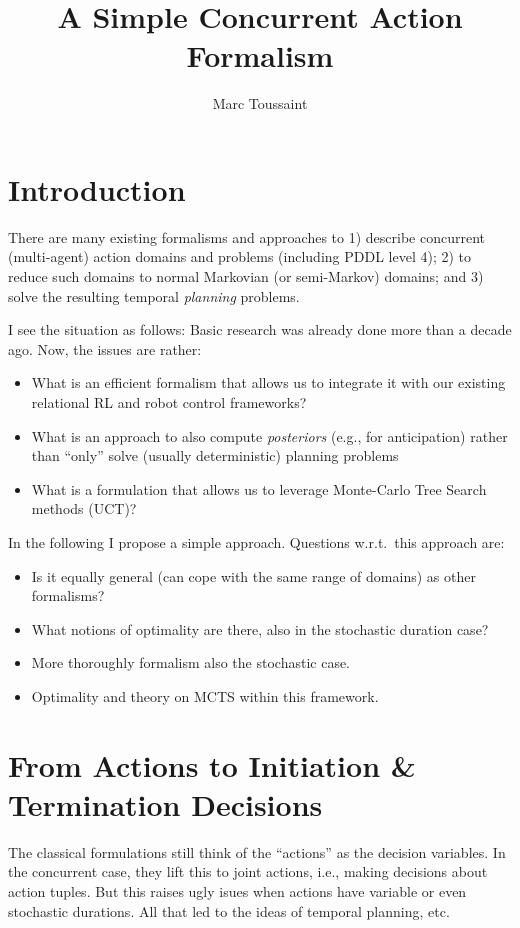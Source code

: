\documentclass[10pt,fleqn,twoside]{article}
\title{A Simple Concurrent Action Formalism}
\author{Marc Toussaint}
\begin{document}
\maketitle

\section{Introduction}

There are many existing formalisms and approaches to 1) describe
concurrent (multi-agent) action domains and problems (including PDDL
level 4); 2) to reduce such domains to normal Markovian (or
semi-Markov) domains; and 3) solve the resulting temporal \emph{planning}
problems. \cite{*}

I see the situation as follows: Basic research was already done more
than a decade ago. Now, the issues are rather:
\begin{itemize}
\item What is an efficient formalism that allows us
  to integrate it with our existing relational RL and robot control
  frameworks?
\item What is an approach to also compute \emph{posteriors} (e.g., for
  anticipation) rather than ``only'' solve (usually deterministic)
  planning problems
\item What is a formulation that allows us to leverage Monte-Carlo
  Tree Search methods (UCT)?
\end{itemize}

In the following I propose a simple approach. Questions w.r.t.\ this
approach are:
\begin{itemize}
\item Is it equally general (can cope with the same range of domains)
as other formalisms?
\item What notions of optimality are there, also in the stochastic
duration case?
\item More thoroughly formalism also the stochastic case.
\item Optimality and theory on MCTS within this framework.
\end{itemize}



\section{From Actions to Initiation \& Termination Decisions}

The classical formulations still think of the ``actions''
as the decision variables. In the concurrent case, they lift this to
joint actions, i.e., making decisions about action tuples. But this
raises ugly isues when actions have variable or even stochastic
durations. All that led to the ideas of temporal planning, etc.
\end{document}
